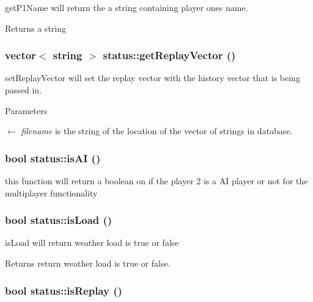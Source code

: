getP1Name will return the a string containing player ones name. \begin{DoxyReturn}{Returns}
a string 
\end{DoxyReturn}
\hypertarget{classstatus_a606237d9c1b4e0ff9f2da4103aebe4de}{
\subsubsection[{getReplayVector}]{\setlength{\rightskip}{0pt plus 5cm}vector$<$ string $>$ status::getReplayVector ()}}
\label{classstatus_a606237d9c1b4e0ff9f2da4103aebe4de}


setReplayVector will set the replay vector with the history vector that is being passed in. 
\begin{DoxyParams}{Parameters}
\item[\mbox{$\leftarrow$} {\em filename}]is the string of the location of the vector of strings in database. \end{DoxyParams}
\hypertarget{classstatus_abbe7c4fa038e61cf8949432ece0defcb}{
\subsubsection[{isAI}]{\setlength{\rightskip}{0pt plus 5cm}bool status::isAI ()}}
\label{classstatus_abbe7c4fa038e61cf8949432ece0defcb}
this function will return a boolean on if the player 2 is a AI player or not for the multiplayer functionality \hypertarget{classstatus_a20a3ca42b44610b5f37f7ca415b3ebd0}{
\subsubsection[{isLoad}]{\setlength{\rightskip}{0pt plus 5cm}bool status::isLoad ()}}
\label{classstatus_a20a3ca42b44610b5f37f7ca415b3ebd0}


isLoad will return weather load is true or false \begin{DoxyReturn}{Returns}
return weather load is true or false. 
\end{DoxyReturn}
\hypertarget{classstatus_a7054b21075d50ee360d86b89c8b5d007}{
\subsubsection[{isReplay}]{\setlength{\rightskip}{0pt plus 5cm}bool status::isReplay ()}}
\label{classstatus_a7054b21075d50ee360d86b89c8b5d007}


